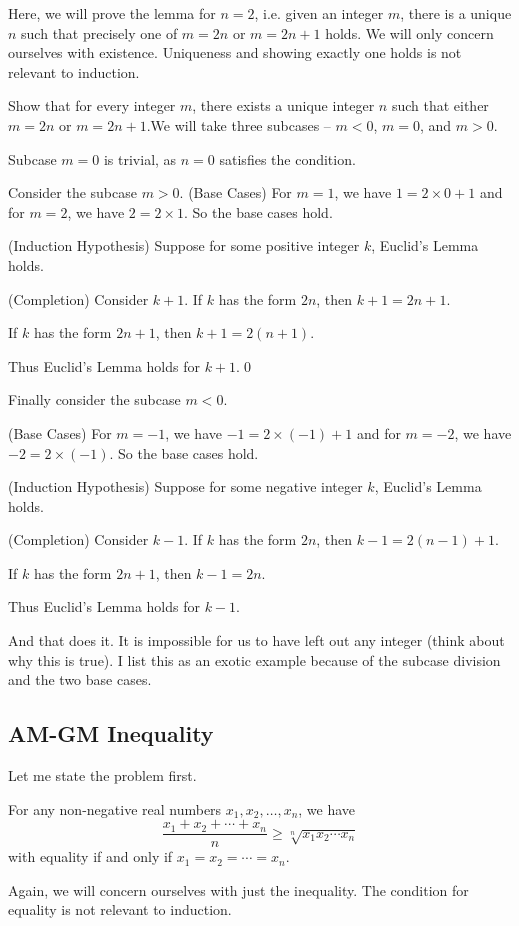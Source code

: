Here, we will prove the lemma for $n = 2$, i.e. given an integer $m$, there is a unique $n$ such that precisely one of $m = 2n$ or $m = 2n + 1$ holds.
\newpage
We will only concern ourselves with existence. Uniqueness and showing exactly one holds is not relevant to induction.
\begin{SWP}{\prb}{Show that for every integer $m$, there exists a unique integer $n$ such that either $m = 2n$ or $m = 2n + 1$.}We will take three subcases -- $m < 0$, $m = 0$, and $m > 0$.

Subcase $m = 0$ is trivial, as $n = 0$ satisfies the condition.

Consider the subcase $m > 0$.
(Base Cases) For $m = 1$, we have $1 = 2\times 0 + 1$ and for $m = 2$, we have $2 = 2 \times 1$. So the base cases hold.

(Induction Hypothesis) Suppose for some positive integer $k$, Euclid's Lemma holds.

(Completion) Consider $k + 1$. If $k$ has the form $2n$, then $k + 1 = 2n + 1$.

If $k$ has the form $2n + 1$, then $k + 1 = 2(n + 1)$.

Thus Euclid's Lemma holds for $k + 1$.\qed

Finally consider the subcase $m < 0$.

(Base Cases) For $m = -1$, we have $-1 = 2\times (-1) + 1$ and for $m = -2$, we have $-2 = 2 \times (-1)$. So the base cases hold.

(Induction Hypothesis) Suppose for some negative integer $k$, Euclid's Lemma holds.

(Completion) Consider $k - 1$. If $k$ has the form $2n$, then $k - 1 = 2(n - 1) + 1$.

If $k$ has the form $2n + 1$, then $k - 1 = 2n$.

Thus Euclid's Lemma holds for $k - 1$.
\end{SWP}
And that does it. It is impossible for us to have left out any integer (think about why this is true). I list this as an exotic example because of the subcase division and the two base cases.

\subsection*{AM-GM Inequality}
Let me state the problem first.
\begin{SNP}{\thm}
For any non-negative real numbers $x_1, x_2, \ldots, x_n$, we have
\[
\dfrac{x_1 + x_2 + \cdots + x_n}{n} \geq \sqrt[n]{x_1 x_2 \cdots x_n}
\]
with equality if and only if $x_1 = x_2 = \cdots = x_n$.
\end{SNP}
Again, we will concern ourselves with just the inequality. The condition for equality is not relevant to induction.

